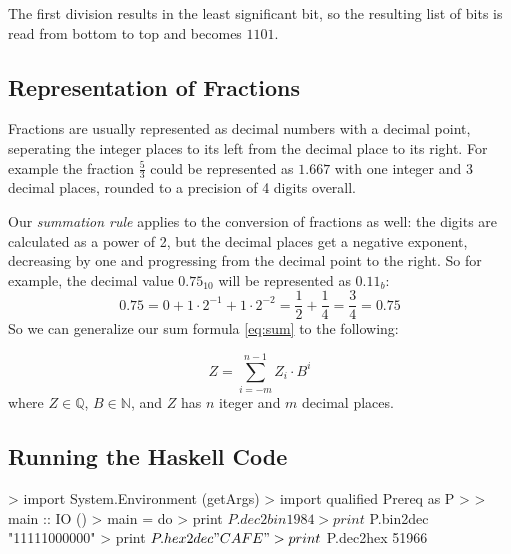 The first division results in the least significant bit, so the resulting list of bits is read from bottom to top and becomes $1101$.

\begin{impl}
\end{impl}


\subsection{Representation of Fractions}

Fractions are usually represented as decimal numbers with a decimal point, seperating the integer places to its left from the decimal place to its right.
For example the fraction $$ could be represented as $1.667$ with one integer and 3 decimal places, rounded to a precision of 4 digits overall.

Our \emph{summation rule} applies to the conversion of fractions as well: the digits are calculated as a power of 2, but the decimal places get a negative exponent, decreasing by one and progressing from the decimal point to the right.
So for example, the decimal value $0.75_{10}$ will be represented as $0.11_{b}$:
\begin{equation*}
0.75=0+1\cdot2^{-1}+1\cdot2^{-2}=\frac{1}{2}+\frac{1}{4}=\frac{3}{4}=0.75
\end{equation*}
So we can generalize our sum formula \eqref{eq:sum} to the following:

\begin{equation}
\boxed{Z=\sum_{i=-m}^{n-1} Z_i \cdot B^i}
\end{equation}
where $Z \in {}$, $B \in {}$, and $Z$ has $n$ iteger and $m$ decimal places.

\subsection{Running the Haskell Code}

\begin{haskellcode}

> import System.Environment (getArgs)
> import qualified Prereq as P
> 
> main :: IO ()
> main = do
>   print $ P.dec2bin 1984
>   print $ P.bin2dec "11111000000"
>   print $ P.hex2dec "CAFE"
>   print $ P.dec2hex 51966

\end{haskellcode}